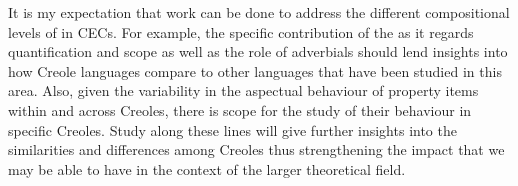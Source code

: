 It is my expectation that work can be done to address the different compositional levels of  in CECs. For example, the specific contribution of the  as it regards quantification and scope as well as the role of adverbials should lend insights into how Creole languages compare to other languages that have been studied in this area. Also, given the variability in the aspectual behaviour of property items within and across Creoles, there is scope for the study of their behaviour in specific Creoles. Study along these lines will give further insights into the similarities and differences among Creoles thus strengthening the impact that we may be able to have in the context of the larger theoretical field.
